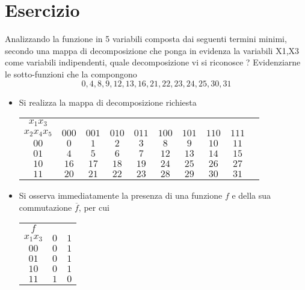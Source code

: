 \documentclass[a4paper]{extarticle}
\renewcommand\arraystretch{}
\begin{document}
\noindent
\section{Esercizio}
Analizzando la funzione in 5 variabili composta dai seguenti termini minimi, secondo una mappa di decomposizione che ponga in evidenza la variabili X1,X3 come variabili indipendenti, quale decomposizione vi si riconosce ? Evidenziarne le sotto-funzioni che la compongono
\[0,4,8,9,12,13,16,21,22,23,24,25,30,31\]

\begin{itemize}
    \item Si realizza la mappa di decomposizione richiesta

    \noindent
    \begin{table}[H]
    \setlength{\tabcolsep}{4pt}
    \renewcommand{\arraystretch}{1.2}
    \centering
    \begin{tabular}{|c|c|c|c|c|c|c|c|c|c|}
        $x_1x_3$ &&&&&&&&\\
        $x_2x_4x_5$  & $000$ & $001$ & $010$ & $011$ & $100$ & $101$ & $110$ & $111$ \\
        \hline
        $00$ & \cellcolor{orange!25!white}$0$ & $1$ & $2$ & $3$ & \cellcolor{orange!25!white}$8$ & \cellcolor{orange!25!white}$9$ & $10$ & $11$\\
        $01$ & \cellcolor{orange!25!white}$4$ & $5$ & $6$ & $7$ & \cellcolor{orange!25!white}$12$ &\cellcolor{orange!25!white} $13$ & $14$ & $15$\\
        $10$ & \cellcolor{orange!25!white}$16$ & $17$ & $18$ & $19$ & \cellcolor{orange!25!white}$24$ & \cellcolor{orange!25!white}$25$ & $26$ & $27$\\
        $11$ & $20$ &\cellcolor{orange!25!white} $21$ &\cellcolor{orange!25!white} $22$ & \cellcolor{orange!25!white}$23$ & $28$ & $29$ & \cellcolor{orange!25!white}$30$ & \cellcolor{orange!25!white}$31$\\
        \hline 
    \end{tabular}
    \end{table}

    \item Si osserva immediatamente la presenza di una funzione $f$ e della sua commutazione $\overline{f}$, per cui
    
    \noindent
    \begin{table}[H]
    \setlength{\tabcolsep}{4pt}
    \renewcommand{\arraystretch}{1.2}
    \centering
    \begin{tabular}{|c|c|c|}
        $f$ & &\\
        $x_1x_3$ & $0$ & $1$\\
        \hline 
        $00$ & $0$ & $1$\\
        $01$ & $0$ & $1$\\
        $10$ & $0$ & $1$\\
        $11$ & $1$ & $0$\\
    \end{tabular}
    \end{table}


\end{itemize}
\end{document}
